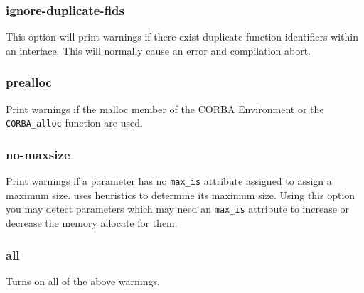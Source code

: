 \subsubsection{ignore-duplicate-fids}
This option will print warnings if there exist duplicate function identifiers
within an interface. This will normally cause an error and compilation 
abort.

\subsubsection{prealloc}
Print warnings if the malloc member of the CORBA Environment or the
\verb|CORBA_alloc| function are used.

\subsubsection{no-maxsize}
Print warnings if a parameter has no \verb|max_is| attribute assigned
to assign a maximum size. \dice{} uses heuristics to determine its
maximum size. Using this option you may detect parameters which may
need an \verb|max_is| attribute to increase or decrease the memory
allocate for them.

\subsubsection{all}
Turns on all of the above warnings.

